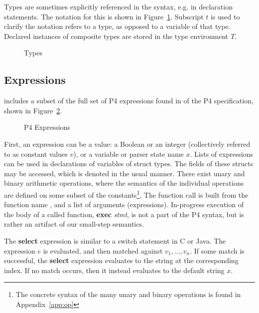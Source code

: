 \documentclass[UTF8]{article}
\begin{document}
Types are sometimes explicitly referenced in the syntax, e.g. in declaration statements. The notation for this is shown in Figure~\ref{fig:types}. Subscript $t$ is used to clarify the notation refers to a type, as opposed to a variable of that type. Declared instances of composite types are stored in the type environment $T$.

\begin{figure}[h!]
\centering\ottgrammartabular{
\ottbt\ottinterrule
\ottt\ottafterlastrule
}
\caption{Types}
\label{fig:types}
\end{figure}

\newpage
\subsection{Expressions}
\newcommand{\fmap}{\textit{F}}

\pfott{} includes a subset of the full set of P4 expressions found in {} of the P4 specification, shown in Figure~\ref{fig:exp}.

\begin{figure}[h!]
\centering\ottgrammartabular{
\otte\ottafterlastrule
}
\caption{P4 Expressions}
\label{fig:exp}
\end{figure}
\newcommand{\stmt}{\textit{stmt}}
\newcommand{\cval}{\ensuremath{v}}
\newcommand{\fexec}[1]{\textbf{exec}\,\,#1}

First, an expression can be a value: a Boolean or an integer (collectively referred to as constant values \cval{}), or a variable or parser state name $x$. Lists of expressions can be used in declarations of variables of struct types. The fields of these structs may be accessed, which is denoted in the usual manner. There exist unary and binary arithmetic operations, where the semantics of the individual operations are defined on some subset of the constants\footnote{The concrete syntax of the many unary and binary operations is found in Appendix~\ref{app:op}}. The function call is built from the function name \fn{}, and a list of arguments (expressions). In-progress execution of the body of a called function, \fexec{\stmt{}}, is not a part of the P4 syntax, but is rather an artifact of our small-step semantics.

The \textbf{select} expression is similar to a switch statement in C or Java. The expression $e$ is evaluated, and then matched against $v_1 , \ldots , v_n$. If some match is successful, the \textbf{select} expression evaluates to the string at the corresponding index. If no match occurs, then it instead evaluates to the default string $x$.
\end{document}
